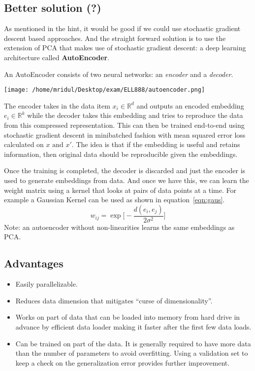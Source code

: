 \documentclass[11pt]{article}
\begin{document}
\subsection{Better solution (?)}
\label{sec:orga81f2dd}
As mentioned in the hint, it would be good if we could use stochastic
gradient descent based approaches. And the straight forward solution
is to use the extension of PCA that makes use of stochastic gradient
descent: a deep learning architecture called \textbf{AutoEncoder}.\par
An AutoEncoder consists of two neural networks: an \textit{encoder}
and a \textit{decoder}.
\begin{center}
\texttt{[image: /home/mridul/Desktop/exam/ELL888/autoencoder.png]}
\end{center}
The encoder takes in the data item \(x_i\in\mathbb{R}^d\) and outputs
an encoded embedding \(e_i\in\mathbb{R}^k\) while the decoder takes
this embedding and tries to reproduce the data from this compressed
representation. This can then be trained end-to-end using stochastic gradient
descent in minibatched fashion with mean squared error loss calculated
on \(x\text{ and }x'\). The idea is that if the embedding is useful
and retains information, then original data should be reproducible
given the embeddings.\par
Once the training is completed, the decoder is discarded and just the
encoder is used to generate embeddings from data. And once we have
this, we can learn the weight matrix using a kernel that looks at
pairs of data points at a time. For example a Gaussian Kernel can be
used as shown in equation~\ref{eqn:gaus}.
\begin{equation}
w_{ij}=\operatorname{exp}\biggl[-\frac{d(e_i,e_j)}{2\sigma^2}\biggr]
\label{eqn:gaus}
\end{equation}
Note: an autoencoder without non-linearities learns the same
embeddings as PCA.
\subsection{Advantages}
\label{sec:orgb58fa9b}
\begin{itemize}
\item Easily parallelizable.
\item Reduces data dimension that mitigates ``curse of dimensionality''.
\item Works on part of data that can be loaded into memory from hard drive
in advance by efficient data loader making it faster after the first
few data loads.
\item Can be trained on part of the data. It is generally required to have
more data than the number of parameters to avoid overfitting. Using
a validation set to keep a check on the generalization error
provides further improvement.
\end{itemize}
\end{document}
